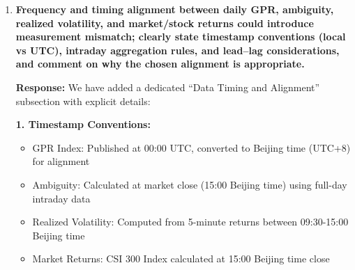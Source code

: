 \documentclass[12pt]{article}
\begin{document}
\begin{enumerate}
\begin{responsebox}
    \textit{``While our approach assumes local stationarity within benchmark windows, we test this assumption by examining ambiguity persistence across structural breaks. Results show ambiguity reverts slowly (half-life of approximately 15 trading days), suggesting temporary regime shifts are captured by our adaptive framework.''}
    \vspace{0.5cm}

    \textbf{3. Methodological Note:}
    \vspace{0.5cm}
    
    We have appended the following discussion:
    
    \textit{``Alternative benchmark specifications yield qualitatively similar results. Using (i) expanding windows from 2010, (ii) regime-switching benchmarks, or (iii) minimum KL divergence with alpha parameter -1 instead of -infinity, the correlation with our baseline ambiguity measure exceeds 0.85. However, alternative measures may be more appropriate in specific contexts: expanding windows better capture long-term structural changes but may over-smooth recent shocks; regime-switching models explicitly account for different market states but require stronger parametric assumptions.''}
    
    In addition, we have discussed alternative divergence choices (e.g., Jensen–Shannon divergence) and generalized-mean aggregations over benchmark sets. These extensions produce materially similar inference in our data, which supports the robustness of using minimum KL divergence as a parsimonious and interpretable baseline.
    \end{responsebox}

    \vspace{0.5cm}

    \item \textbf{Frequency and timing alignment between daily GPR, ambiguity, realized volatility, and market/stock returns could introduce measurement mismatch; clearly state timestamp conventions (local vs UTC), intraday aggregation rules, and lead--lag considerations, and comment on why the chosen alignment is appropriate.}

    \begin{responsebox}
    \vspace{0.5cm}
    \textbf{Response:} We have added a dedicated ``Data Timing and Alignment'' subsection with explicit details:

    \textbf{1. Timestamp Conventions:}
    \begin{itemize}
        \item GPR Index: Published at 00:00 UTC, converted to Beijing time (UTC+8) for alignment
        \item Ambiguity: Calculated at market close (15:00 Beijing time) using full-day intraday data
        \item Realized Volatility: Computed from 5-minute returns between 09:30-15:00 Beijing time
        \item Market Returns: CSI 300 Index calculated at 15:00 Beijing time close
    \end{itemize}


\end{responsebox}
\end{enumerate}
\end{document}
